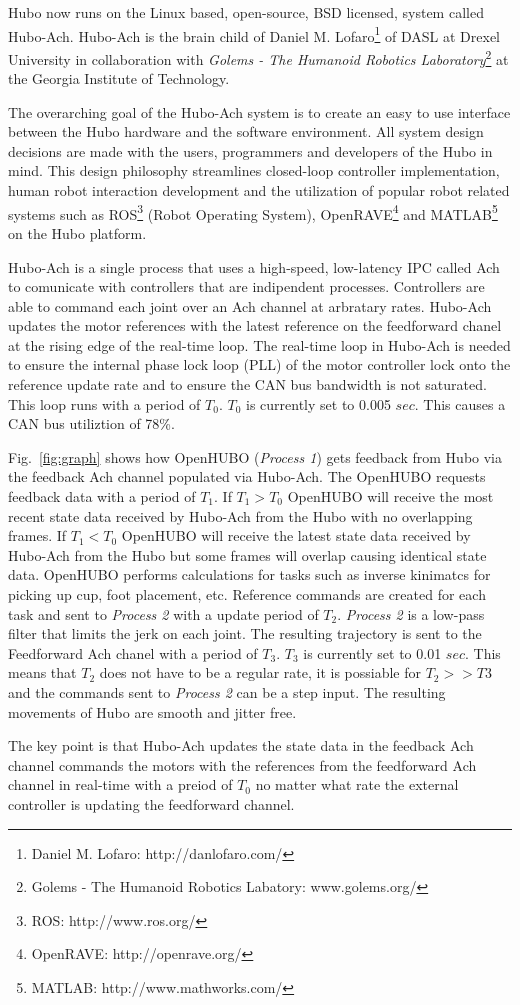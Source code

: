 Hubo now runs on the Linux based, open-source, BSD licensed, system called Hubo-Ach.  
Hubo-Ach is the brain child of Daniel M. Lofaro\footnote{Daniel M. Lofaro: http://danlofaro.com/} of DASL at Drexel University in collaboration with \textit{Golems - The Humanoid Robotics Laboratory}\footnote{Golems - The Humanoid Robotics Labatory: www.golems.org/} at the Georgia Institute of Technology.  

The overarching goal of the Hubo-Ach system is to create an easy to use interface between the Hubo hardware and the software environment.  
All system design decisions are made with the users, programmers and developers of the Hubo in mind.
This design philosophy streamlines closed-loop controller implementation, human robot interaction development and the utilization of popular robot related systems such as ROS\footnote{ROS: http://www.ros.org/} (Robot Operating System), OpenRAVE\footnote{OpenRAVE: http://openrave.org/} and MATLAB\footnote{MATLAB: http://www.mathworks.com/} on the Hubo platform.

Hubo-Ach is a single process that uses a high-speed, low-latency IPC called Ach \cite{ach} to comunicate with controllers that are indipendent processes.
Controllers are able to command each joint over an Ach channel at arbratary rates.
Hubo-Ach updates the motor references with the latest reference on the feedforward chanel at the rising edge of the real-time loop.
The real-time loop in Hubo-Ach is needed to ensure the internal phase lock loop (PLL) of the motor controller lock onto the reference update rate and to ensure the CAN bus bandwidth is not saturated.
This loop runs with a period of $T_0$.
$T_0$ is currently set to 0.005 $sec$.
This causes a CAN bus utiliztion of 78\%.

Fig.~\ref{fig:graph} shows how OpenHUBO (\textit{Process 1}) gets feedback from Hubo via the feedback Ach channel populated via Hubo-Ach.  
The OpenHUBO requests feedback data with a period of $T_1$.
If $T_1>T_0$ OpenHUBO will receive the most recent state data received by Hubo-Ach from the Hubo with no overlapping frames.
If $T_1<T_0$ OpenHUBO will receive the latest state data received by Hubo-Ach from the Hubo but some frames will overlap causing identical state data.
OpenHUBO performs calculations for tasks such as inverse kinimatcs for picking up cup, foot placement, etc.
Reference commands are created for each task and sent to \textit{Process 2} with a update period of $T_2$.
\textit{Process 2} is a low-pass filter that limits the jerk on each joint.
The resulting trajectory is sent to the Feedforward Ach chanel with a period of $T_3$.
$T_3$ is currently set to 0.01 $sec$.
This means that $T_2$ does not have to be a regular rate, it is possiable for $T_2>>T3$ and the commands sent to \textit{Process 2} can be a step input.
The resulting movements of Hubo are smooth and jitter free.





The key point is that Hubo-Ach updates the state data in the feedback Ach channel commands the motors with the references from the feedforward Ach channel in real-time with a preiod of $T_0$ no matter what rate the external controller is updating the feedforward channel.  









